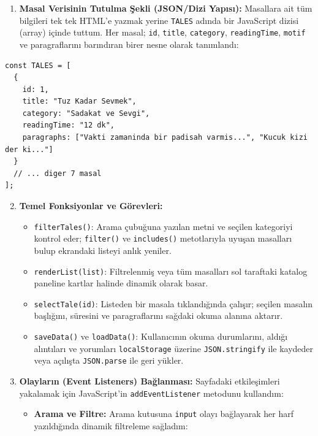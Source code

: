 \documentclass[12pt,a4paper]{article}
\begin{document}
\begin{enumerate}
\item \textbf{Masal Verisinin Tutulma Şekli (JSON/Dizi Yapısı):} Masallara ait tüm bilgileri tek tek HTML'e yazmak yerine \texttt{TALES} adında bir JavaScript dizisi (array) içinde tuttum. Her masal; \texttt{id}, \texttt{title}, \texttt{category}, \texttt{readingTime}, \texttt{motif} ve paragraflarını barındıran birer nesne olarak tanımlandı:
\end{enumerate}

\begin{lstlisting}[caption={TALES Veri Yapısı}]
const TALES = [
  {
    id: 1,
    title: "Tuz Kadar Sevmek",
    category: "Sadakat ve Sevgi",
    readingTime: "12 dk",
    paragraphs: ["Vakti zamaninda bir padisah varmis...", "Kucuk kizi der ki..."]
  }
  // ... diger 7 masal
];
\end{lstlisting}

\begin{enumerate}
\setcounter{enumi}{1}
\item \textbf{Temel Fonksiyonlar ve Görevleri:}
\begin{itemize}
  \item \texttt{filterTales()}: Arama çubuğuna yazılan metni ve seçilen kategoriyi kontrol eder; \texttt{filter()} ve \texttt{includes()} metotlarıyla uyuşan masalları bulup ekrandaki listeyi anlık yeniler.
  \item \texttt{renderList(list)}: Filtrelenmiş veya tüm masalları sol taraftaki katalog paneline kartlar halinde dinamik olarak basar.
  \item \texttt{selectTale(id)}: Listeden bir masala tıklandığında çalışır; seçilen masalın başlığını, süresini ve paragraflarını sağdaki okuma alanına aktarır.
  \item \texttt{saveData()} ve \texttt{loadData()}: Kullanıcının okuma durumlarını, aldığı alıntıları ve yorumları \texttt{localStorage} üzerine \texttt{JSON.stringify} ile kaydeder veya açılışta \texttt{JSON.parse} ile geri yükler.
\end{itemize}

\item \textbf{Olayların (Event Listeners) Bağlanması:} Sayfadaki etkileşimleri yakalamak için JavaScript'in \texttt{addEventListener} metodunu kullandım:
\begin{itemize}
  \item \textbf{Arama ve Filtre:} Arama kutusuna \texttt{input} olayı bağlayarak her harf yazıldığında dinamik filtreleme sağladım:
\end{itemize}
\end{enumerate}
\end{document}
